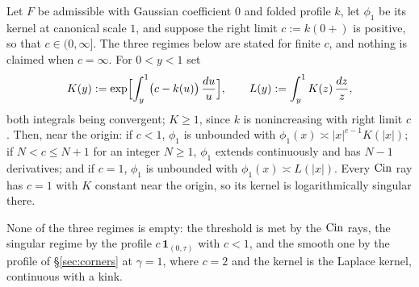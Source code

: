 \begin{proposition}
\label{prop:cin-origin-singularity}
Let $F$ be admissible with Gaussian coefficient $0$ and folded profile $k$, let $\phi_1$ be its
kernel at canonical scale $1$, and suppose the right limit $c := k(0{+})$ is positive, so that
$c \in (0,\infty]$. The three regimes below
are stated for finite $c$, and nothing is claimed when $c = \infty$. For $0 < y < 1$ set
\[
  K(y) := \exp\Bigl[\int_y^1 \bigl(c - k(u)\bigr)\,\frac{du}{u}\Bigr],
  \qquad
  L(y) := \int_y^1 K(z)\,\frac{dz}{z},
\]
both integrals being convergent; $K \ge 1$, since $k$ is nonincreasing with right limit $c$. Then,
near the origin: if $c < 1$, $\phi_1$ is unbounded with $\phi_1(x) \asymp |x|^{c-1}K(|x|)$; if
$N < c \le N+1$ for an integer $N \ge 1$, $\phi_1$ extends continuously and has $N-1$ derivatives;
and if $c = 1$, $\phi_1$ is unbounded with $\phi_1(x) \asymp L(|x|)$. Every $\operatorname{Cin}$ ray has $c = 1$
with $K$ constant near the origin, so its kernel is logarithmically singular there.
\end{proposition}

None of the three regimes is empty: the threshold is met by the $\operatorname{Cin}$ rays, the singular
regime by the profile $c\,\mathbf 1_{(0,\tau)}$ with $c < 1$, and the smooth one by the
\Matern{} profile of \S\ref{sec:corners} at $\gamma = 1$, where $c = 2$ and the kernel is the
Laplace kernel, continuous with a kink.

